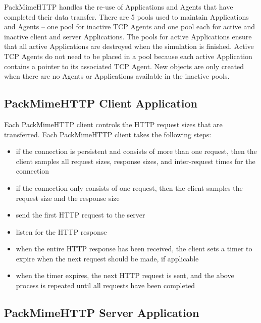 PackMimeHTTP handles the re-use of Applications and Agents that have
completed their data transfer. There are 5 pools used to maintain
Applications and Agents -- one pool for inactive TCP Agents and one
pool each for active and inactive client and server Applications. The
pools for active Applications ensure that all active Applications are
destroyed when the simulation is finished. Active TCP Agents do not
need to be placed in a pool because each active Application contains a
pointer to its associated TCP Agent. New objects are only created when
there are no Agents or Applications available in the inactive pools. 

\subsection{PackMimeHTTP Client Application}

Each PackMimeHTTP client controls the HTTP request sizes that are
transferred. Each PackMimeHTTP client takes the following steps: 
\begin{itemize}
\item{if the connection is persistent and consists of more than one
  request, then the client samples all request sizes, response sizes,
  and inter-request times for the connection}
\item{if the connection only consists of one request, then the client
  samples the request size and the response size}
\item{send the first HTTP request to the server}
\item{listen for the HTTP response}
\item{when the entire HTTP response has been received, the client sets
a timer to expire when the next request should be made, if applicable}
\item{when the timer expires, the next HTTP request is sent, and the
above process is repeated until all requests have been completed}
\end{itemize}

\subsection{PackMimeHTTP Server Application}

